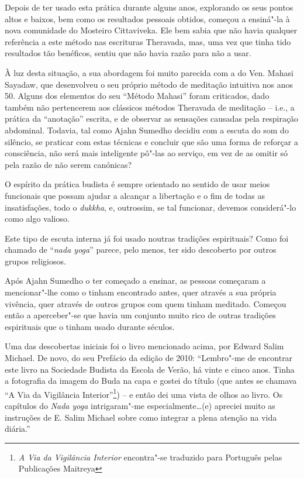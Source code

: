 Depois de ter usado esta prática durante alguns anos, explorando os seus
pontos altos e baixos, bem como os resultados pessoais obtidos, começou
a ensiná"-la à nova comunidade do Mosteiro Cittaviveka. Ele bem sabia que
não havia qualquer referência a este método nas escrituras Theravada,
mas, uma vez que tinha tido resultados tão benéficos, sentiu que não
havia razão para não a usar.

À luz desta situação, a sua abordagem foi muito parecida com a do Ven.
Mahasi Sayadaw, que desenvolveu o seu próprio método de meditação
intuitiva nos anos 50. Alguns dos elementos do seu ``Método Mahasi''
foram criticados, dado também não pertencerem aos clássicos métodos
Theravada de meditação -- i.e., a prática da ``anotação'' escrita, e de
observar as sensações causadas pela respiração abdominal. Todavia, tal
como Ajahn Sumedho decidiu com a escuta do som do silêncio, se praticar
com estas técnicas e concluir que são uma forma de reforçar a
consciência, não será mais inteligente pô"-las ao serviço, em vez de as
omitir só pela razão de não serem canónicas?

O espírito da prática budista é sempre orientado no sentido de usar
meios funcionais que possam ajudar a alcançar a libertação e o fim de
todas as insatisfações, todo o \emph{dukkha}, e, outrossim, se tal
funcionar, devemos considerá"-lo como algo valioso.

\smallskip

 Este tipo de escuta interna já foi usado noutras tradições
espirituais? Como foi chamado de ``\emph{nada yoga}'' parece, pelo
menos, ter sido descoberto por outros grupos religiosos.

 Após Ajahn Sumedho o ter começado a ensinar, as pessoas começaram a
mencionar"-lhe como o tinham encontrado antes, quer através a sua própria
vivência, quer através de outros grupos com quem tinham meditado.
Começou então a aperceber"-se que havia um conjunto muito rico de outras
tradições espirituais que o tinham usado durante séculos.


Uma das descobertas iniciais foi o livro mencionado acima, por Edward Salim
Michael. De novo, do seu Prefácio da edição de 2010: ``Lembro"-me de encontrar
este livro na Sociedade Budista da Escola de Verão, há vinte e cinco anos. Tinha
a fotografia da imagem do Buda na capa e gostei do título (que antes se chamava
``A Via da Vigilância Interior''\footnote{\emph{A Via da Vigilância Interior}
  encontra"-se traduzido para Português pelas Publicações Maitreya}) -- e então
dei uma vista de olhos ao livro. Os capítulos do \emph{Nada yoga} intrigaram"-me
especialmente\ldots{}(e) apreciei muito as instruções de E. Salim Michael sobre
como integrar a plena atenção na vida diária.''

